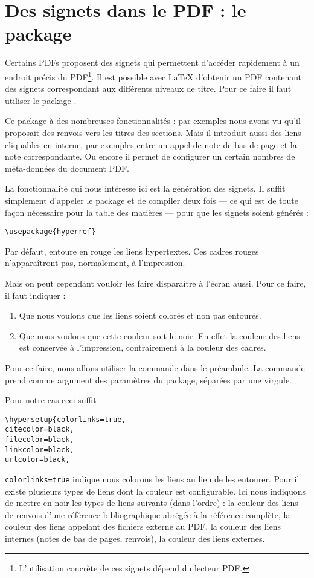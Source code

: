 \section{Des signets dans le PDF : le package }\label{hyperref}

Certains PDFs proposent des signets qui permettent d'accéder rapidement à un endroit précis du PDF\footnote{L'utilisation concrète de ces signets dépend du lecteur PDF.}. Il est possible avec \LaTeX{} d'obtenir un PDF contenant des signets correspondant aux différents niveaux de titre. Pour ce faire il faut utiliser le package .

Ce package à des nombreuses fonctionnalités : par exemples nous avons vu qu'il proposait des renvois vers les titres des sections.
Mais il introduit aussi des liens cliquables en interne, par exemples entre un appel de note de bas de page et la note correspondante. Ou encore il permet de configurer un certain nombres de méta-données du document PDF.

La fonctionnalité qui nous intéresse ici est la génération des signets. Il suffit simplement d'appeler le package et de compiler deux fois --- ce qui est de toute façon nécessaire pour la table des matières --- pour que les signets soient générés :

\begin{verbatim}
\usepackage{hyperref}
\end{verbatim}

Par défaut,  entoure en rouge les liens hypertextes. Ces cadres rouges n'apparaîtront pas, normalement, à l'impression.

Mais on peut cependant vouloir les faire disparaître à l'écran aussi. Pour ce faire, il faut indiquer :
\begin{enumerate}
\item Que nous voulons que les liens soient colorés et non pas entourés.
\item Que nous voulons que cette couleur soit le noir. En effet la couleur des liens est conservée à l'impression, contrairement à la couleur des cadres.
\end{enumerate}

Pour ce faire, nous allons utiliser la commande  dans le préambule. La commande prend comme argument des paramètres du package, séparées par une virgule.

Pour notre cas ceci suffit
\begin{verbatim}
\hypersetup{colorlinks=true,
citecolor=black,
filecolor=black,
linkcolor=black,
urlcolor=black,
\end{verbatim}

\verb|colorlinks=true| indique nous colorons les liens au lieu de les entourer. Pour  il existe plusieurs types de liens dont la couleur est configurable. Ici nous indiquons de mettre en noir les types de liens suivants (dans l'ordre) : la couleur des liens de renvois d'une référence bibliographique abrégée à la référence complète, la couleur des liens appelant des fichiers externe au PDF, la couleur des liens internes (notes de bas de pages, renvois), la couleur des liens externes.
